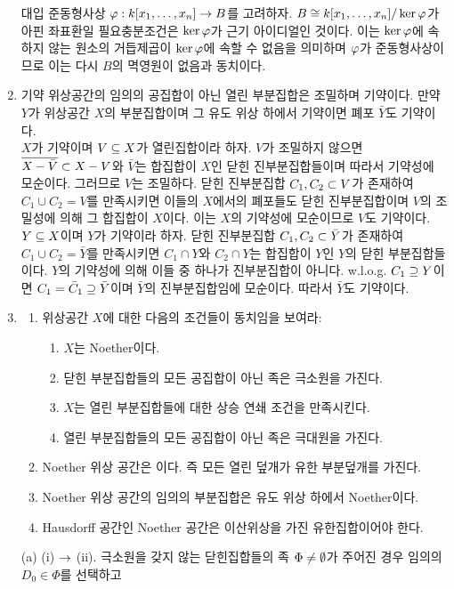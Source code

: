 \begin{enumerate}[label=\tb{1.\arabic*.},itemindent=0mm,itemsep=4mm]
	대입 준동형사상 $\varphi:k[x_1,\ldots,x_n]\rightarrow B$를 고려하자.
	$B\cong k[x_1,\ldots,x_n]/\ker\varphi$가 아핀 좌표환일 필요충분조건은 $\ker\varphi$가 근기 아이디얼인 것이다.
	이는 $\ker\varphi$에 속하지 않는 원소의 거듭제곱이 $\ker\varphi$에 속할 수 없음을 의미하며
	$\varphi$가 준동형사상이므로 이는 다시 $B$의 멱영원이 없음과 동치이다.
	\item 기약 위상공간의 임의의 공집합이 아닌 열린 부분집합은 조밀하며 기약이다.
	만약 $Y$가 위상공간 $X$의 부분집합이며 그 유도 위상 하에서 기약이면 폐포 $\bar Y$도 기약이다.\\
	\sol $X$가 기약이며 $V\subseteq X$가 열린집합이라 하자. $V$가 조밀하지 않으면 $\overline{X-\bar V}\subset X-V$와 $\bar V$는
	합집합이 $X$인 닫힌 진부분집합들이며 따라서 기약성에 모순이다. 그러므로 $V$는 조밀하다.
	닫힌 진부분집합 $C_1,C_2\subset V$가 존재하여 $C_1\cup C_2=V$를 만족시키면 이들의 $X$에서의 폐포들도 닫힌 진부분집합이며
	$V$의 조밀성에 의해 그 합집합이 $X$이다. 이는 $X$의 기약성에 모순이므로 $V$도 기약이다.\\
	$Y\subseteq X$이며 $Y$가 기약이라 하자. 닫힌 진부분집합 $C_1,C_2\subset\bar Y$가 존재하여 $C_1\cup C_2=\bar Y$를 만족시키면
	$C_1\cap Y$와 $C_2\cap Y$는 합집합이 $Y$인 $Y$의 닫힌 부분집합들이다. $Y$의 기약성에 의해 이들 중 하나가 진부분집합이 아니다.
	w.l.o.g. $C_1\supseteq Y$이면 $C_1=\bar C_1\supseteq\bar Y$이며 $\bar Y$의 진부분집합임에 모순이다. 따라서 $\bar Y$도 기약이다.
	\item \begin{enumerate}[label=(\alph*)]
	\item 위상공간 $X$에 대한 다음의 조건들이 동치임을 보여라:
	\begin{enumerate}[label=(\roman*)]
	\item $X$는 Noether이다.
	\item 닫힌 부분집합들의 모든 공집합이 아닌 족은 극소원을 가진다.
	\item $X$는 열린 부분집합들에 대한 상승 연쇄 조건을 만족시킨다.
	\item 열린 부분집합들의 모든 공집합이 아닌 족은 극대원을 가진다.
	\end{enumerate}
	\item Noether 위상 공간은 이다. 즉 모든 열린 덮개가 유한 부분덮개를 가진다.
	\item Noether 위상 공간의 임의의 부분집합은 유도 위상 하에서 Noether이다.
	\item Hausdorff 공간인 Noether 공간은 이산위상을 가진 유한집합이어야 한다.
	\end{enumerate}
	\sol (a) (i) $\rightarrow$ (ii). 극소원을 갖지 않는 닫힌집합들의 족 $\Phi\ne\emptyset$가 주어진 경우 임의의 $D_0\in\Phi$를 선택하고

\end{enumerate}
